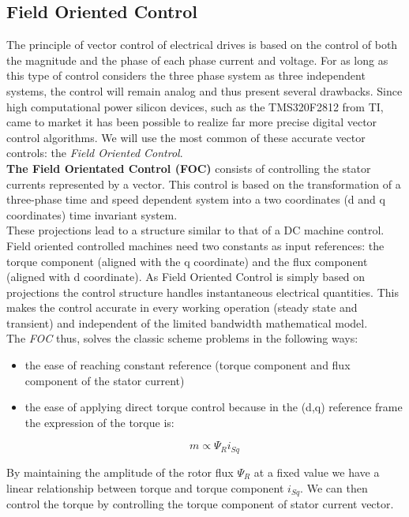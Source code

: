 \documentclass[12pt]{article}
\begin{document}
\subsection{Field Oriented Control}
The principle of vector control of electrical drives is based on the control of both the magnitude and the phase of each phase current and voltage. For as long as this type of control considers the three phase system as three independent systems, the control will remain analog and thus present several drawbacks. Since high computational power silicon devices, such as the TMS320F2812 from TI, came to market it has been possible to realize far more precise digital vector control algorithms. We will use the most common of these accurate vector controls: the \textit{Field Oriented Control}.\\
\textbf{The Field Orientated Control (FOC)} consists of controlling the stator currents represented by a vector. This control is based on the transformation of a three-phase
time and speed dependent system into a two coordinates (d and q coordinates) time invariant system.\\ 
These projections lead to a structure similar to that of a DC
machine control. Field oriented controlled machines need two constants as input references: the torque component (aligned with the q coordinate) and the flux component (aligned with d coordinate). As Field Oriented Control is simply based on
projections the control structure handles instantaneous electrical quantities. This makes the control accurate in every working operation (steady state and transient) and independent of the limited bandwidth mathematical model.\\ The \textit{FOC} thus, solves the classic scheme problems in the following ways:
\begin{itemize}
\item  the ease of reaching constant reference (torque component and flux component of the
stator current)
\item the ease of applying direct torque control because in the (d,q) reference frame the
expression of the torque is:
\begin{center}
$$m\propto\Psi_{R}i_{Sq}$$
\end{center}
\end{itemize}
By maintaining the amplitude of the rotor flux $\Psi_{R}$ at a fixed value we have a linear relationship between torque and torque component $i_{Sq}$. We can then control the torque
by controlling the torque component of stator current vector.\\
\end{document}
